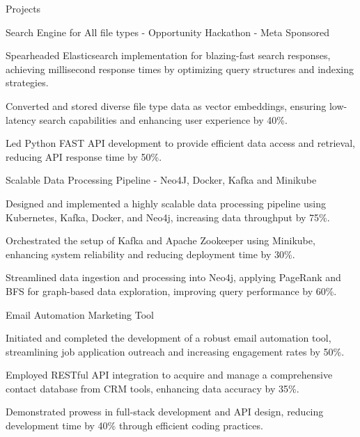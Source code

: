 \documentclass{resume} %
\begin{document}
    \begin{rSection}{Projects}
                    \begin{rSubsection}
                                    {Search Engine for All file types {-} Opportunity Hackathon {-} Meta Sponsored}
                                {\normalfont{ - }}{}{}
                                    \item Spearheaded Elasticsearch implementation for blazing{-}fast search responses, achieving millisecond response times by optimizing query structures and indexing strategies.
                                    \item Converted and stored diverse file type data as vector embeddings, ensuring low{-}latency search capabilities and enhancing user experience by 40\%.
                                    \item Led Python FAST API development to provide efficient data access and retrieval, reducing API response time by 50\%.
                            \end{rSubsection}
                    \begin{rSubsection}
                                    {Scalable Data Processing Pipeline {-} Neo4J, Docker, Kafka and Minikube}
                                {\normalfont{ - }}{}{}
                                    \item Designed and implemented a highly scalable data processing pipeline using Kubernetes, Kafka, Docker, and Neo4j, increasing data throughput by 75\%.
                                    \item Orchestrated the setup of Kafka and Apache Zookeeper using Minikube, enhancing system reliability and reducing deployment time by 30\%.
                                    \item Streamlined data ingestion and processing into Neo4j, applying PageRank and BFS for graph{-}based data exploration, improving query performance by 60\%.
                            \end{rSubsection}
                    \begin{rSubsection}
                                    {Email Automation Marketing Tool}
                                {\normalfont{ - }}{}{}
                                    \item Initiated and completed the development of a robust email automation tool, streamlining job application outreach and increasing engagement rates by 50\%.
                                    \item Employed RESTful API integration to acquire and manage a comprehensive contact database from CRM tools, enhancing data accuracy by 35\%.
                                    \item Demonstrated prowess in full{-}stack development and API design, reducing development time by 40\% through efficient coding practices.
                            \end{rSubsection}
            \end{rSection}
\end{document}
